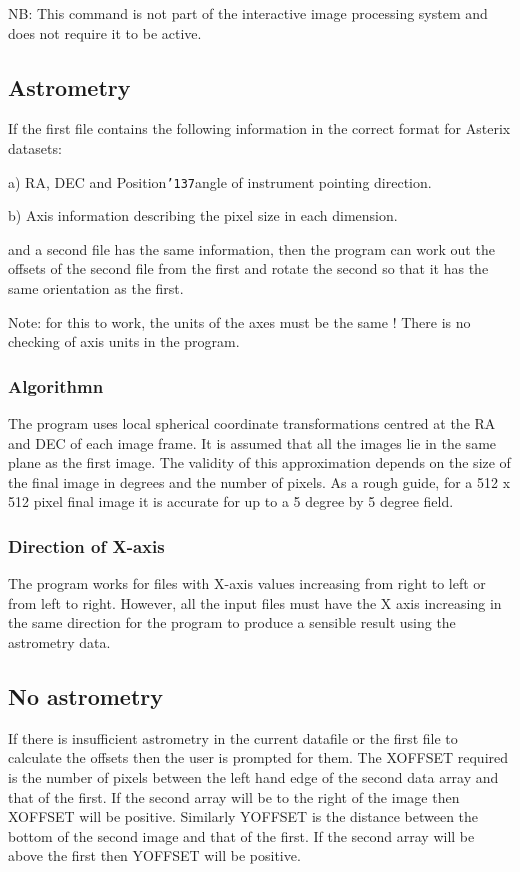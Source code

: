 \documentclass{book}
\renewcommand{\_}{{\tt\char'137}}     %
\begin{document}
NB: This command is not part of the interactive image processing
system and does not require it to be active.
\subsection{Astrometry}
If the first file contains the following information in the correct
format for Asterix datasets:

a) RA, DEC and Position\_angle of instrument pointing direction.

b) Axis information describing the pixel size in each dimension.

and a second file has the same information, then the program can work
out the offsets of the second file from the first and rotate the second
so that it has the same orientation as the first.

Note: for this to work, the units of the axes must be the same !
There is no checking of axis units in the program.

\subsubsection{Algorithmn}
The program uses local spherical coordinate transformations centred at
the RA and DEC of each image frame. It is assumed that all the images
lie in the same plane as the first image. The validity of this
approximation depends on the size of the final image in degrees and
the number of pixels. As a rough guide, for a 512 x 512 pixel final
image it is accurate for up to a 5 degree by 5 degree field.

\subsubsection{Direction of X-axis}
The program works for files with X-axis values increasing from right to
left or from left to right. However, all the input files must have the
X axis increasing in the same direction for the program to produce a
sensible result using the astrometry data.

\subsection{No astrometry}
If there is insufficient astrometry in the current datafile or the
first file to calculate the offsets then the user is prompted for
them. The XOFFSET required is the number of pixels between the left
hand edge of the second data array and that of the first. If the second
array will be to the right of the image then XOFFSET will be positive.
Similarly YOFFSET is the distance between the bottom of the second
image and that of the first. If the second array will be above the
first then YOFFSET will be positive.
\end{document}
